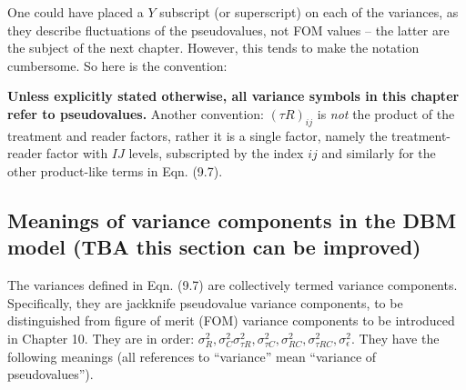 \documentclass[
]{book}
\begin{document}
One could have placed a \(Y\) subscript (or superscript) on each of the variances, as they describe fluctuations of the pseudovalues, not FOM values -- the latter are the subject of the next chapter. However, this tends to make the notation cumbersome. So here is the convention:

\textbf{Unless explicitly stated otherwise, all variance symbols in this chapter refer to pseudovalues. }
Another convention: \((\tau R)_{ij}\) is \emph{not} the product of the treatment and reader factors, rather it is a single factor, namely the treatment-reader factor with \(IJ\) levels, subscripted by the index \(ij\) and similarly for the other product-like terms in Eqn. (9.7).

\hypertarget{meanings-of-variance-components-in-the-dbm-model-tba-this-section-can-be-improved}{%
\subsection{Meanings of variance components in the DBM model (TBA this section can be improved)}\label{meanings-of-variance-components-in-the-dbm-model-tba-this-section-can-be-improved}}

The variances defined in Eqn. (9.7) are collectively termed variance components. Specifically, they are jackknife pseudovalue variance components, to be distinguished from figure of merit (FOM) variance components to be introduced in Chapter 10. They are in order: \(\sigma_{R}^{2} ,\sigma_{C}^{2} \sigma_{\tau R}^{2},\sigma_{\tau C}^{2},\sigma_{RC}^{2}, \sigma_{\tau RC}^{2},\sigma_{\epsilon}^{2}\). They have the following meanings (all references to ``variance'' mean ``variance of pseudovalues'').
\end{document}
